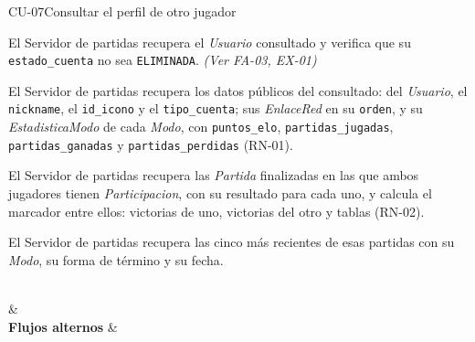 \begin{fichacu}{CU-07}{Consultar el perfil de otro jugador}
{\begin{cuenum}[start=1]
      \item El Servidor de partidas recupera el \textit{Usuario} consultado y verifica que su \texttt{estado\_\allowbreak{}cuenta} no sea \texttt{ELIMINADA}. \textit{(Ver \mbox{FA-03}, \mbox{EX-01})}
      \item El Servidor de partidas recupera los datos públicos del consultado: del \textit{Usuario}, el \texttt{nickname}, el \texttt{id\_\allowbreak{}icono} y el \texttt{tipo\_\allowbreak{}cuenta}; sus \textit{EnlaceRed} en su \texttt{orden}, y su \textit{EstadisticaModo} de cada \textit{Modo}, con \texttt{puntos\_\allowbreak{}elo}, \texttt{partidas\_\allowbreak{}jugadas}, \texttt{partidas\_\allowbreak{}ganadas} y \texttt{partidas\_\allowbreak{}perdidas} (\mbox{RN-01}).
      \item El Servidor de partidas recupera las \textit{Partida} finalizadas en las que ambos jugadores tienen \textit{Participacion}, con su resultado para cada uno, y calcula el marcador entre ellos: victorias de uno, victorias del otro y tablas (\mbox{RN-02}).
      \item El Servidor de partidas recupera las cinco más recientes de esas partidas con su \textit{Modo}, su forma de término y su fecha.
    \end{cuenum}} \\
   &  \\ \hline
  \textbf{Flujos alternos} & 
\end{fichacu}
